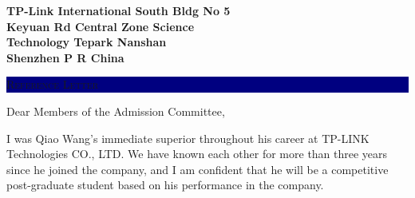 \documentclass[11pt]{letter} %
\begin{document}

\date{} %

\begin{letter}{\large \bfseries TP-Link International South Bldg No 5 \\ Keyuan Rd Central Zone Science  \\ Technology Tepark Nanshan  \\ Shenzhen P R China} %


\colorbox{Navy}{ %

\parbox[t]{\linewidth}{ %

\vspace*{14pt} %

\hfill \color{white} \textsc{\huge Reference Letter} %

\vspace*{14pt} %
}}


\signature{
Cai Chenyu \\ %
\textbf{Property Manager} \\ %
\textsc{Tp-Link Technologies Co., Ltd.} \\ %
\small{E: caishenyu\_11@sina.com \\ M: +86-185-8903-6136} %
}


\opening{Dear Members of the Admission Committee,}

I was Qiao Wang's immediate superior throughout his career at TP-LINK Technologies CO., LTD. We have known each other for more than three years since he joined the company, and I am confident that he will be a competitive post-graduate student based on his performance in the company.


\end{letter}
\end{document}
